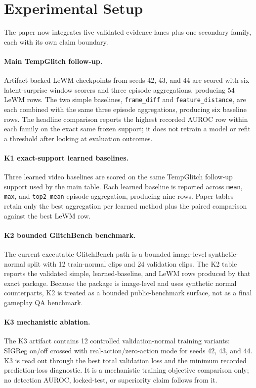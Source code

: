 \section{Experimental Setup}
\label{sec:experiments}

The paper now integrates five validated evidence lanes plus one secondary family, each with its
own claim boundary.

\paragraph{Main TempGlitch follow-up.}
Artifact-backed LeWM checkpoints from seeds 42, 43, and 44 are scored with six latent-surprise
window scorers and three episode aggregations, producing 54 LeWM rows. The two simple baselines,
\texttt{frame\_diff} and \texttt{feature\_distance}, are each combined with the same three episode
aggregations, producing six baseline rows. The headline comparison reports the highest recorded
AUROC row within each family on the exact same frozen support; it does not retrain a model or
refit a threshold after looking at evaluation outcomes.

\paragraph{K1 exact-support learned baselines.}
Three learned video baselines are scored on the same TempGlitch follow-up support used by the main
table. Each learned baseline is reported across \texttt{mean}, \texttt{max}, and
\texttt{top2\_mean} episode aggregation, producing nine rows. Paper tables retain only the best
aggregation per learned method plus the paired comparison against the best LeWM row.

\paragraph{K2 bounded GlitchBench benchmark.}
The current executable GlitchBench path is a bounded image-level synthetic-normal split with 12
train-normal clips and 24 validation clips. The K2 table reports the validated simple,
learned-baseline, and LeWM rows produced by that exact package. Because the package is image-level
and uses synthetic normal counterparts, K2 is treated as a bounded public-benchmark surface, not
as a final gameplay QA benchmark.

\paragraph{K3 mechanistic ablation.}
The K3 artifact contains 12 controlled validation-normal training variants: SIGReg on/off crossed
with real-action/zero-action mode for seeds 42, 43, and 44. K3 is read out through the best total
validation loss and the minimum recorded prediction-loss diagnostic. It is a mechanistic training
objective comparison only; no detection AUROC, locked-test, or superiority claim follows from it.

